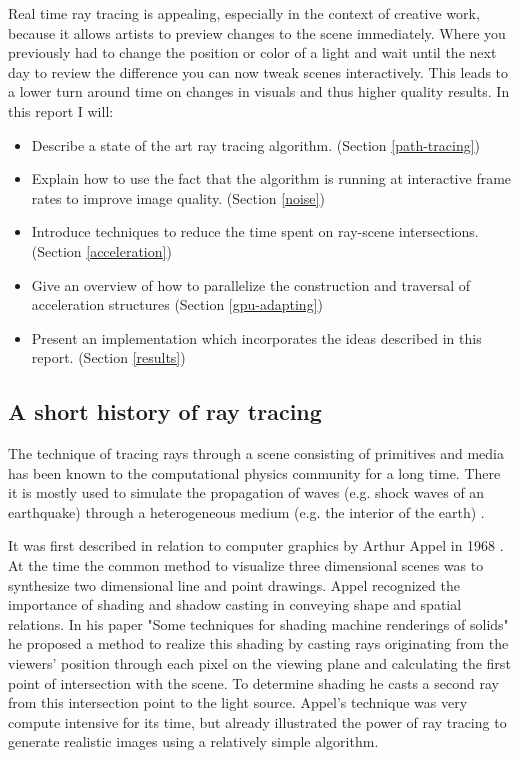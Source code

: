 \documentclass{ACGSeminar}
\begin{document}
Real time ray tracing is appealing, especially in the context of creative work, because it allows artists to preview changes to the scene immediately. Where you previously had to change the position or color of a light and wait until the next day to review the difference you can now tweak scenes interactively. This leads to a lower turn around time on changes in visuals and thus higher quality results.
In this report I will:
\begin{itemize}
\item Describe a state of the art ray tracing algorithm. (Section \ref{path-tracing})
\item Explain how to use the fact that the algorithm is running at interactive frame rates to improve image quality. (Section \ref{noise})
\item Introduce techniques to reduce the time spent on ray-scene intersections. (Section \ref{acceleration})
\item Give an overview of how to parallelize the construction and traversal of acceleration structures (Section \ref{gpu-adapting}) 
\item Present an implementation which incorporates the ideas described in this report. (Section \ref{results})
\end{itemize}


\subsection{A short history of ray tracing}
The technique of tracing rays through a scene consisting of primitives and media has been known to the computational physics community for a long time. There it is mostly used to simulate the propagation of waves (e.g. shock waves of an earthquake) through a heterogeneous medium (e.g. the interior of the earth) \cite{GJI:GJI93}.

It was first described in relation to computer graphics by Arthur Appel in 1968  \cite{Appel68}. At the time the common method to visualize three dimensional scenes was to synthesize two dimensional line and point drawings. Appel recognized the importance of shading and shadow casting in conveying shape and spatial relations. In his paper "Some techniques for shading machine renderings of solids" he proposed a method to realize this shading by casting rays originating from the viewers' position through each pixel on the viewing plane and calculating the first point of intersection with the scene. To determine shading he casts a second ray from this intersection point to the light source. Appel's technique was very compute intensive for its time, but already illustrated the power of ray tracing to generate realistic images using a relatively simple algorithm.
\end{document}
